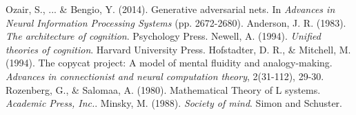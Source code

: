 \documentclass[11pt,letterpaper]{article}
\begin{document}
\begin{thebibliography}{}
    Ozair, S., ... \& Bengio, Y. (2014).
    Generative adversarial nets.
    In \emph{Advances in Neural Information Processing Systems} (pp.
    2672-2680).
    Anderson, J. R. (1983).
    \emph{The architecture of cognition}. Psychology Press.
    Newell, A. (1994).
    \emph{Unified theories of cognition}. Harvard University Press.
    Hofstadter, D. R., \& Mitchell, M. (1994).
    The copycat project: A model of mental fluidity and analogy-making.
    \emph{Advances in connectionist and neural computation theory}, 2(31-112), 29-30.
    Rozenberg, G., \& Salomaa, A. (1980).
    Mathematical Theory of L systems.
    \emph{Academic Press, Inc.}.
    Minsky, M. (1988).
    \emph{Society of mind}.
    Simon and Schuster.
\end{thebibliography}
\end{document}
